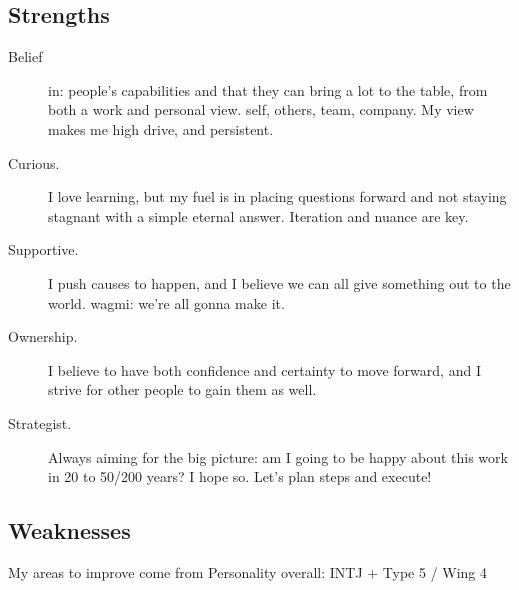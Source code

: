 \documentclass[10pt, a4paper, twocolumn]{article}
\begin{document}
\subsection*{Strengths}

\begin{description}
 \item[Belief] in: people's capabilities and that they can bring a lot to the table, from both a work and personal view.
 self, others, team, company.
 My view %
 makes me %
 high drive, and persistent.
\item[Curious.] I love learning, but my fuel is in placing questions forward and not staying stagnant with a simple eternal answer. Iteration and nuance are key.
\item[Supportive.] I push causes to happen, and I believe we can all give something out to the world. wagmi: we're all gonna make it.
\item[Ownership.] I believe to have both confidence and certainty to move forward, and I strive for other people to gain them as well.
\item[Strategist.] Always aiming for the big picture: am I going to be happy about this work in 20 to 50/200 years? I hope so. Let's plan steps and execute!
 \end{description}

\subsection*{Weaknesses}

\noindent
My areas to improve come from Personality overall:
INTJ
+
Type 5 / Wing 4
\end{document}
